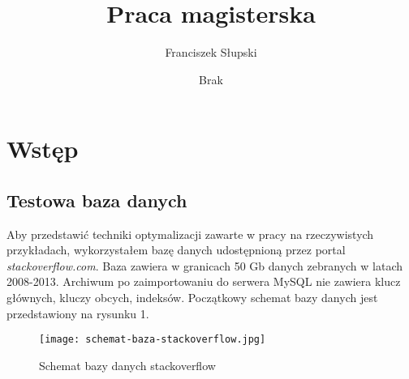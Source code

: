 \documentclass[12pt]{article}
\title{Praca magisterska}
\author{Franciszek Słupski}
\date{Brak}
\begin{document}
\maketitle

\tableofcontents
\newpage
\section{Wstęp}

\subsection{Testowa baza danych}
Aby przedstawić techniki optymalizacji zawarte w pracy na rzeczywistych przykładach, wykorzystałem bazę danych udostępnioną przez portal \textit{stackoverflow.com}. Baza zawiera w granicach 50 Gb danych zebranych w latach 2008-2013. Archiwum po zaimportowaniu do serwera MySQL nie zawiera klucz głównych, kluczy obcych, indeksów.
Początkowy schemat bazy danych jest przedstawiony na rysunku 1.
\begin{figure}
    \texttt{[image: schemat-baza-stackoverflow.jpg]} 
    \caption{Schemat bazy danych stackoverflow}
\end{figure}


\newpage

\newpage

\newpage

\newpage

\newpage

\newpage

\newpage

\newpage

\newpage

\end{document}
